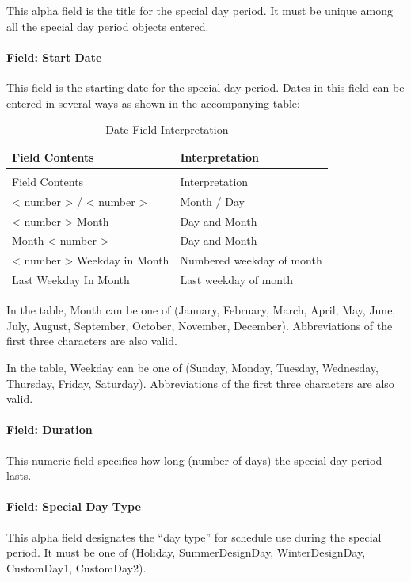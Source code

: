 This alpha field is the title for the special day period. It must be unique among all the special day period objects entered.

\paragraph{Field: Start Date}\label{field-start-date}

This field is the starting date for the special day period. Dates in this field can be entered in several ways as shown in the accompanying table:

\begin{longtable}[c]{@{}ll@{}}
\caption{Date Field Interpretation \label{table:date-field-interpretation}} \tabularnewline
\toprule
Field Contents & Interpretation \tabularnewline
\midrule
\endfirsthead

\caption[]{Date Field Interpretation} \tabularnewline
\toprule
Field Contents & Interpretation \tabularnewline
\midrule
\endhead

< number >  /  < number > & Month / Day \tabularnewline
< number >  Month & Day and Month \tabularnewline
Month  < number > & Day and Month \tabularnewline
< number >  Weekday in Month & Numbered weekday of month \tabularnewline
Last Weekday In Month & Last weekday of month \tabularnewline
\bottomrule
\end{longtable}

In the table, Month can be one of (January, February, March, April, May, June, July, August, September, October, November, December). Abbreviations of the first three characters are also valid.

In the table, Weekday can be one of (Sunday, Monday, Tuesday, Wednesday, Thursday, Friday, Saturday). Abbreviations of the first three characters are also valid.

\paragraph{Field: Duration}\label{field-duration}

This numeric field specifies how long (number of days) the special day period lasts.

\paragraph{Field: Special Day Type}\label{field-special-day-type}

This alpha field designates the ``day type'' for schedule use during the special period. It must be one of (Holiday, SummerDesignDay, WinterDesignDay, CustomDay1, CustomDay2).

